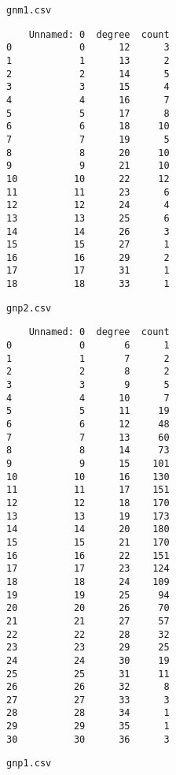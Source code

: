 \documentclass[11pt]{article}
\begin{document}
    
    \begin{Verbatim}[commandchars=\\\{\}]
gnm1.csv

    \end{Verbatim}

    
    \begin{verbatim}
    Unnamed: 0  degree  count
0            0      12      3
1            1      13      2
2            2      14      5
3            3      15      4
4            4      16      7
5            5      17      8
6            6      18     10
7            7      19      5
8            8      20     10
9            9      21     10
10          10      22     12
11          11      23      6
12          12      24      4
13          13      25      6
14          14      26      3
15          15      27      1
16          16      29      2
17          17      31      1
18          18      33      1
    \end{verbatim}

    
    \begin{Verbatim}[commandchars=\\\{\}]
gnp2.csv

    \end{Verbatim}

    
    \begin{verbatim}
    Unnamed: 0  degree  count
0            0       6      1
1            1       7      2
2            2       8      2
3            3       9      5
4            4      10      7
5            5      11     19
6            6      12     48
7            7      13     60
8            8      14     73
9            9      15    101
10          10      16    130
11          11      17    151
12          12      18    170
13          13      19    173
14          14      20    180
15          15      21    170
16          16      22    151
17          17      23    124
18          18      24    109
19          19      25     94
20          20      26     70
21          21      27     57
22          22      28     32
23          23      29     25
24          24      30     19
25          25      31     11
26          26      32      8
27          27      33      3
28          28      34      1
29          29      35      1
30          30      36      3
    \end{verbatim}

    
    \begin{Verbatim}[commandchars=\\\{\}]
gnp1.csv

    \end{Verbatim}
\end{document}
